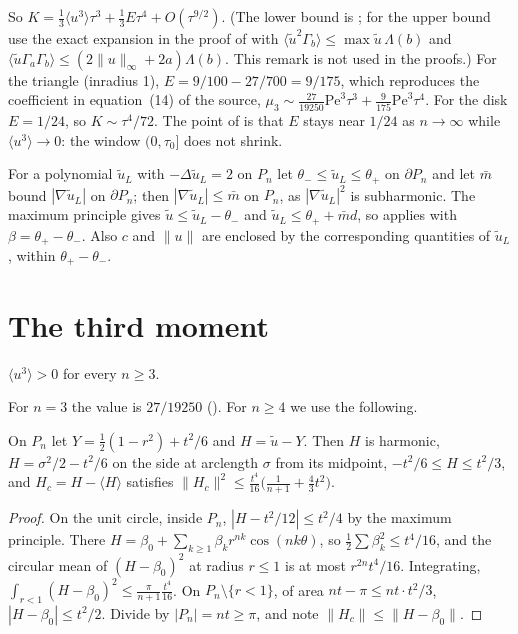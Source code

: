 \documentclass[11pt,a4paper]{report}
\DeclareRobustCommand*{\avg}[1]{\langle #1\rangle}
\DeclareRobustCommand*{\norm}[1]{\lVert #1\rVert}
\DeclareRobustCommand*{\ut}{\tilde u}
\DeclareRobustCommand*{\Pg}{P_n}
\begin{document}
\begin{remark}\label{rem:E}
So \(K=\frac13\avg{u^3}\tau^3+\frac13E\tau^4+O(\tau^{9/2})\). (The lower bound is ; for the upper bound use
the exact expansion in the proof of  with \(\avg{\ut^2\Gamma_b}\le\max\ut\,\Lambda(b)\) and
\(\avg{\ut\Gamma_a\Gamma_b}\le(2\norm u_\infty+2a)\Lambda(b)\). This remark is not used in the proofs.) For the triangle (inradius 1), \(E=9/100-27/700=9/175\), which
reproduces the coefficient in equation~(14) of the source, \(\mu_3\sim\frac{27}{19250}\mathrm{Pe}^3\tau^3+\frac9{175}\mathrm{Pe}^3\tau^4\). For
the disk \(E=1/24\), so \(K\sim\tau^4/72\). The point of  is that \(E\) stays near \(1/24\) as \(n\to\infty\) while
\(\avg{u^3}\to0\): the window \((0,\tau_0]\) does not shrink.
\end{remark}

For a polynomial \(\ut_L\) with \(-\Delta\ut_L=2\) on \(\Pg\) let \(\theta_-\le\ut_L\le\theta_+\) on \(\partial\Pg\) and let \(\bar m\)
bound \(|\nabla\ut_L|\) on \(\partial\Pg\); then \(|\nabla\ut_L|\le\bar m\) on \(\Pg\), as \(|\nabla\ut_L|^2\) is subharmonic. The maximum
principle gives \(\ut\le\ut_L-\theta_-\) and \(\ut_L\le\theta_++\bar md\), so  applies with
\(\beta=\theta_+-\theta_-\). Also \(c\) and \(\norm u\) are enclosed by the corresponding quantities of \(\ut_L\), within
\(\theta_+-\theta_-\).

\section{The third moment}\label{sec:u3}

\begin{proposition}\label{prop:u3}
\(\avg{u^3}>0\) for every \(n\ge3\).
\end{proposition}
For \(n=3\) the value is \(27/19250\) (). For \(n\ge4\) we use the following.

\begin{lemma}\label{lem:Hsmall}
On \(\Pg\) let \(Y=\frac12(1-r^2)+t^2/6\) and \(H=\ut-Y\). Then \(H\) is harmonic, \(H=\sigma^2/2-t^2/6\) on the side at arclength
\(\sigma\) from its midpoint, \(-t^2/6\le H\le t^2/3\), and \(H_c=H-\avg H\) satisfies
\(\norm{H_c}^2\le\frac{t^4}{16}\bigl(\frac1{n+1}+\frac43t^2\bigr)\).
\end{lemma}
\begin{proof}
On the unit circle, inside \(\Pg\), \(|H-t^2/12|\le t^2/4\) by the maximum principle. There \(H=\beta_0+\sum_{k\ge1}\beta_kr^{nk}\cos(nk\theta)\),
so \(\frac12\sum\beta_k^2\le t^4/16\), and the circular mean of \((H-\beta_0)^2\) at radius \(r\le1\) is at most
\(r^{2n}t^4/16\). Integrating, \(\int_{r<1}(H-\beta_0)^2\le\frac{\pi}{n+1}\frac{t^4}{16}\). On \(\Pg\setminus\{r<1\}\), of area
\(nt-\pi\le nt\cdot t^2/3\), \(|H-\beta_0|\le t^2/2\). Divide by \(|\Pg|=nt\ge\pi\), and note \(\norm{H_c}\le\norm{H-\beta_0}\).
\end{proof}
\end{document}
